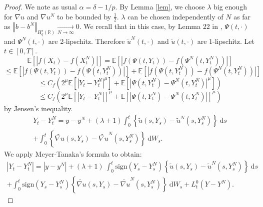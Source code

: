 \documentclass[12pt]{article}
\newcommand{\norme}[1]{\left\Vert #1\right\Vert}
\newcommand{\R}{\mathbb{R}}
\newcommand{\E}{\mathbb{E}}
\newcommand{\di}{\mathrm{d}}
\begin{document}
\begin{proof}
    We note as usual $\alpha = \delta - 1/p$.
    By Lemma \ref{lem}, we choose $\lambda$ big enough for $\nabla u$ and $\nabla u^N$ to be bounded by $\frac{1}{2}$. $\lambda$ can be chosen independently of $N$ as far as $\norme{b - b^N}_{H_q^s(\R)} \underset{N\rightarrow\infty}{\longrightarrow} 0$. We recall that in this case, by Lemma 22 in \cite{Fla-Iss-Rus-2017}, $\Psi(t,\cdot)$ and $\Psi^N(t,\cdot)$ are 2-lipschitz. Therefore $\widetilde{u}^N(t,\cdot)$ and $\widetilde{u}(t,\cdot)$ are $1$-lipschitz.  Let $t\in[0,T]$.      
    \begin{equation*}
    \E\left[\left|f\left(X_t\right)-f\left(X_t^N\right)\right|\right] = \E\left[\left|f\left(\Psi\left(t,Y_t\right)\right)-f\left(\Psi^N\left(t,Y_t^N\right)\right)\right|\right]
    \end{equation*}   
    \begin{equation*}
    \leq  \E\left[\left|f\left(\Psi\left(t,Y_t\right)\right)-f\left(\Psi\left(t,Y_t^N\right)\right)\right|\right]+\E\left[\left|f\left(\Psi\left(t,Y_t^N\right)\right)-f\left(\Psi^N\left(t,Y_t^N\right)\right)\right|\right]
    \end{equation*}  
    \begin{equation*}
    \leq C_f  \left(2^\mu\E\left[\left|Y_t-Y_t^N\right|^\mu\right]+\E\left[\left|\Psi\left(t,Y_t^N\right)-\Psi^N\left(t,Y_t^N\right)\right|^\mu\right]\right)
    \end{equation*}
    \begin{equation}\label{jensen}
    \leq C_f  \left(2^\mu\E\left[\left|Y_t-Y_t^N\right|\right]^\mu+\E\left[\left|\Psi\left(t,Y_t^N\right)-\Psi^N\left(t,Y_t^N\right)\right|\right]^\mu\right)
    \end{equation}    
    by Jensen's inequality. 
    \begin{multline*}
    Y_t-Y_t^N = y-y^N + (\lambda + 1 )\int_0^t\left\{\widetilde{u}\left(s,Y_s\right)-\widetilde{u}^N\left(s,Y_s^N\right)\right\}\ \di s\\ + \int_0^t\left\{\widetilde{\nabla u}\left(s,Y_s\right)-\widetilde{\nabla u}^N\left(s,Y_s^N\right)\right\}\ \di W_s.
    \end{multline*}
    We apply Meyer-Tanaka's formula to obtain:
    \begin{multline*}
    \left|Y_t-Y_t^N\right| = \left|y-y^N\right| + (\lambda + 1)\ \int_0^t\mathrm{sign}(Y_s-Y_s^N)\left\{\widetilde{u}\left(s,Y_s\right)-\widetilde{u}^N\left(s,Y_s^N\right)\right\}\ \di s\\ + \int_0^t\mathrm{sign}(Y_s-Y_s^N)\left\{\widetilde{\nabla u}\left(s,Y_s\right)-\widetilde{\nabla u}^N\left(s,Y_s^N\right)\right\}\ \di W_s + L_t^0(Y-Y^N).

\end{multline*}
\end{proof}
\end{document}
